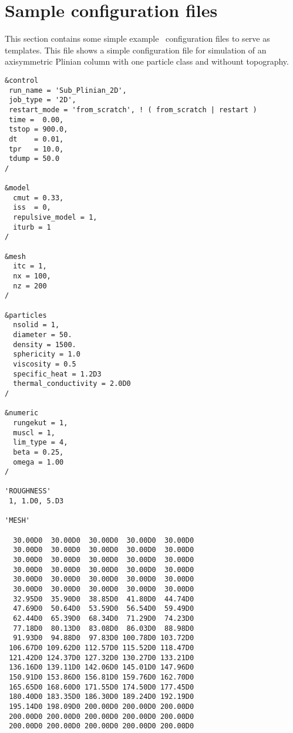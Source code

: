 \section{Sample configuration files}
\label{section:sample}
This section contains some simple example \PDAC\ configuration files to serve
as templates.
\prettypar
This file shows a simple configuration file for simulation of an axisymmetric
Plinian column with one particle class and withount topography.  

\begin{verbatim}
&control
 run_name = 'Sub_Plinian_2D',
 job_type = '2D',
 restart_mode = 'from_scratch', ! ( from_scratch | restart )
 time =  0.00,
 tstop = 900.0,
 dt    = 0.01,
 tpr   = 10.0,
 tdump = 50.0
/

&model
  cmut = 0.33,
  iss  = 0,
  repulsive_model = 1,
  iturb = 1
/

&mesh
  itc = 1, 
  nx = 100,
  nz = 200
/

&particles
  nsolid = 1, 
  diameter = 50.
  density = 1500.
  sphericity = 1.0
  viscosity = 0.5
  specific_heat = 1.2D3
  thermal_conductivity = 2.0D0
/

&numeric
  rungekut = 1,
  muscl = 1,
  lim_type = 4,
  beta = 0.25,
  omega = 1.00
/

'ROUGHNESS'
 1, 1.D0, 5.D3

'MESH'

  30.00D0  30.00D0  30.00D0  30.00D0  30.00D0
  30.00D0  30.00D0  30.00D0  30.00D0  30.00D0
  30.00D0  30.00D0  30.00D0  30.00D0  30.00D0
  30.00D0  30.00D0  30.00D0  30.00D0  30.00D0
  30.00D0  30.00D0  30.00D0  30.00D0  30.00D0
  30.00D0  30.00D0  30.00D0  30.00D0  30.00D0
  32.95D0  35.90D0  38.85D0  41.80D0  44.74D0
  47.69D0  50.64D0  53.59D0  56.54D0  59.49D0
  62.44D0  65.39D0  68.34D0  71.29D0  74.23D0
  77.18D0  80.13D0  83.08D0  86.03D0  88.98D0
  91.93D0  94.88D0  97.83D0 100.78D0 103.72D0
 106.67D0 109.62D0 112.57D0 115.52D0 118.47D0
 121.42D0 124.37D0 127.32D0 130.27D0 133.21D0
 136.16D0 139.11D0 142.06D0 145.01D0 147.96D0
 150.91D0 153.86D0 156.81D0 159.76D0 162.70D0
 165.65D0 168.60D0 171.55D0 174.50D0 177.45D0
 180.40D0 183.35D0 186.30D0 189.24D0 192.19D0
 195.14D0 198.09D0 200.00D0 200.00D0 200.00D0
 200.00D0 200.00D0 200.00D0 200.00D0 200.00D0
 200.00D0 200.00D0 200.00D0 200.00D0 200.00D0


\end{verbatim}
